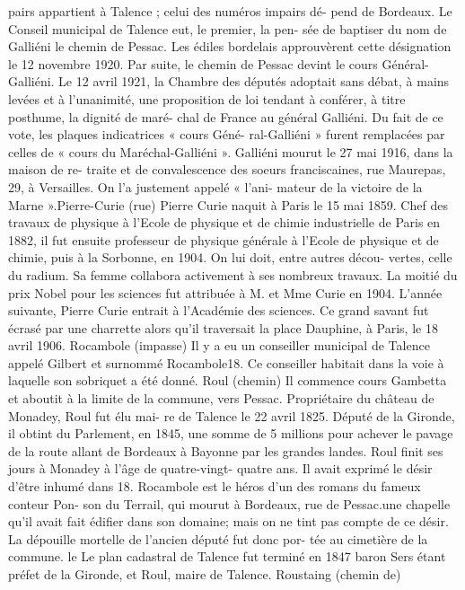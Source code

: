 \documentclass[a4paper,11pt]{book}
\begin{document}
pairs appartient à Talence ; celui des numéros impairs dé-
pend de Bordeaux.
Le Conseil municipal de Talence eut, le premier, la pen-
sée de baptiser du nom de Galliéni le chemin de Pessac.
Les édiles bordelais approuvèrent cette désignation le 12
novembre 1920. Par suite, le chemin de Pessac devint le
cours Général-Galliéni.
Le 12 avril 1921, la Chambre des députés adoptait sans
débat, à mains levées et à l'unanimité, une proposition de
loi tendant à conférer, à titre posthume, la dignité de maré-
chal de France au général Galliéni.
Du fait de ce vote, les plaques indicatrices « cours Géné-
ral-Galliéni » furent remplacées par celles de « cours du
Maréchal-Galliéni ».
Galliéni mourut le 27 mai 1916, dans la maison de re-
traite et de convalescence des soeurs franciscaines, rue
Maurepas, 29, à Versailles. On l'a justement appelé « l'ani-
mateur de la victoire de la Marne ».Pierre-Curie (rue)
Pierre Curie naquit à Paris le 15 mai 1859. Chef des
travaux de physique à l'Ecole de physique et de chimie
industrielle de Paris en 1882, il fut ensuite professeur de
physique générale à l'Ecole de physique et de chimie, puis
à la Sorbonne, en 1904. On lui doit, entre autres décou-
vertes, celle du radium. Sa femme collabora activement à
ses nombreux travaux. La moitié du prix Nobel pour les
sciences fut attribuée à M. et Mme Curie en 1904.
L'année suivante, Pierre Curie entrait à l'Académie des
sciences.
Ce grand savant fut écrasé par une charrette alors qu'il
traversait la place Dauphine, à Paris, le 18 avril 1906.
Rocambole (impasse)
Il y a eu un conseiller municipal de Talence appelé
Gilbert et surnommé Rocambole18. Ce conseiller habitait
dans la voie à laquelle son sobriquet a été donné.
Roul (chemin)
Il commence cours Gambetta et aboutit à la limite de
la commune, vers Pessac.
Propriétaire du château de Monadey, Roul fut élu mai-
re de Talence le 22 avril 1825. Député de la Gironde, il
obtint du Parlement, en 1845, une somme de 5 millions
pour achever le pavage de la route allant de Bordeaux à
Bayonne par les grandes landes.
Roul finit ses jours à Monadey à l'âge de quatre-vingt-
quatre ans. Il avait exprimé le désir d'être inhumé dans
18. Rocambole est le héros d'un des romans du fameux conteur Pon-
son du Terrail, qui mourut à Bordeaux, rue de Pessac.une chapelle qu'il avait fait édifier dans son domaine;
mais on ne tint pas compte de ce désir.
La dépouille mortelle de l'ancien député fut donc por-
tée au cimetière de la commune.
le
Le plan cadastral de Talence fut terminé en 1847
baron Sers étant préfet de la Gironde, et Roul, maire de
Talence.
Roustaing (chemin de)
\end{document}
